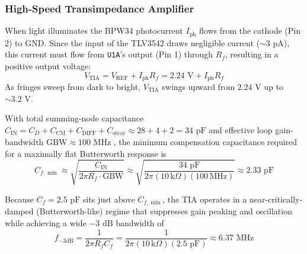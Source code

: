 \subsubsection{High-Speed Transimpedance Amplifier}
When light illuminates the BPW34 photocurrent $I_{\text{ph}}$ flows from the cathode (Pin 2) to $\text{GND}$. Since the input of the TLV3542 draws negligible current ($\sim 3\text{ pA}$), this current must flow from \texttt{U1A}'s output (Pin 1) through $R_f$, resulting in a positive output voltage:
\begin{equation}
    V_{\text{TIA}} = V_{\text{REF}} + I_{\text{ph}} R_f = 2.24\text{ V} + I_{\text{ph}} R_f
\end{equation}
As fringes sweep from dark to bright, $V_{\text{TIA}}$ swings upward from $2.24\text{ V}$ up to $\sim 3.2\text{ V}$. 

With total summing-node capacitance $C_{\text{IN}} = C_D + C_{\text{CM}} + C_{\text{DIFF}} + C_{\text{stray}} \approx 28 + 4 + 2 = 34\text{ pF}$ and effective loop gain-bandwidth $\text{GBW} \approx 100\text{ MHz}$ \cite{TLV354x_Datasheet}, the minimum compensation capacitance required for a maximally flat Butterworth response is
\begin{equation}
    C_{f,\min} \approx \sqrt{\frac{C_{\text{IN}}}{2\pi R_f \cdot \text{GBW}}} \approx \sqrt{\frac{34\text{ pF}}{2\pi (10\,\text{k}\Omega)(100\,\text{MHz})}} \approx 2.33\text{ pF}
\end{equation}

Because $C_f = 2.5\text{ pF}$ sits just above $C_{f,\min}$, the TIA operates in a near-critically-damped (Butterworth-like) regime that suppresses gain peaking and oscillation while achieving a wide $-3\text{ dB}$ bandwidth of
\begin{equation}
    f_{-3\text{dB}} = \frac{1}{2\pi R_f C_f} = \frac{1}{2\pi (10\,\text{k}\Omega)(2.5\text{ pF})} \approx 6.37\text{ MHz}
\end{equation}

